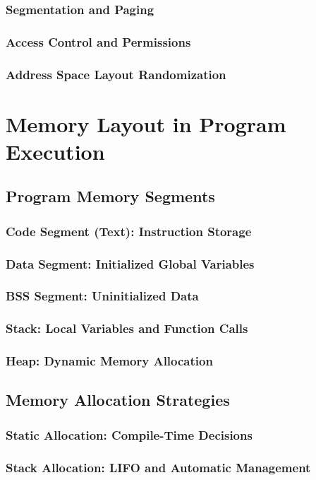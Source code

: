 \documentclass[12pt, oneside, openany]{book}
\begin{document}
\subsubsection{Segmentation and Paging}
\subsubsection{Access Control and Permissions}
\subsubsection{Address Space Layout Randomization}

\section{Memory Layout in Program Execution}
\subsection{Program Memory Segments}
\subsubsection{Code Segment (Text): Instruction Storage}
\subsubsection{Data Segment: Initialized Global Variables}
\subsubsection{BSS Segment: Uninitialized Data}
\subsubsection{Stack: Local Variables and Function Calls}
\subsubsection{Heap: Dynamic Memory Allocation}

\subsection{Memory Allocation Strategies}
\subsubsection{Static Allocation: Compile-Time Decisions}
\subsubsection{Stack Allocation: LIFO and Automatic Management}
\end{document}
